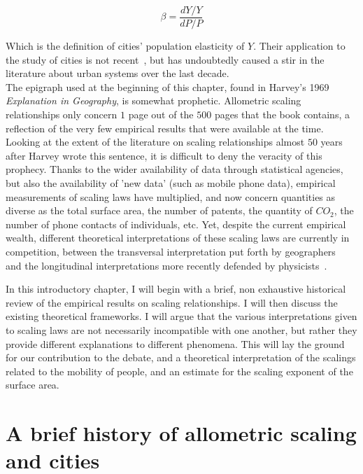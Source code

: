 \begin{equation}
    \beta = \frac{dY/Y}{dP/P}
\end{equation}

Which is the definition of cities' population elasticity of $Y$. Their application to the study of cities
is not recent~\cite{Stewart:1947}, but has undoubtedly caused a stir in the
literature about urban systems over the last decade.\\

The epigraph used at the beginning of this chapter, found in Harvey's 1969
\emph{Explanation in Geography}, is somewhat prophetic.  Allometric scaling
relationships only concern $1$ page out of the $500$ pages that the book
contains, a reflection of the very few empirical results that were available at
the time.  Looking at the extent of the literature on scaling relationships
almost $50$ years after Harvey wrote this sentence, it is difficult to deny the
veracity of this prophecy. Thanks to the wider availability of data through
statistical agencies, but also the availability of 'new data' (such as mobile
phone data), empirical measurements of scaling laws have multiplied,
and now concern quantities as diverse as the total surface area, the number of
patents, the quantity of $CO_2$, the number of phone contacts of individuals,
etc. Yet, despite the current empirical wealth, different theoretical
interpretations of these scaling laws are currently in competition, between the
transversal interpretation put forth by geographers~\cite{Pumain:2006} and the
longitudinal interpretations more recently defended by
physicists~\cite{Bettencourt:2013, Louf:2014_smog}. 

In this introductory chapter, I will begin with a brief, non exhaustive
historical review of the empirical results on scaling relationships. I will then
discuss the existing theoretical frameworks. I will argue that the various
interpretations given to scaling laws are not necessarily incompatible with one
another, but rather they provide different explanations to different phenomena.
This will lay the ground for our contribution to the debate, and a theoretical
interpretation of the scalings related to the mobility of people, and an estimate for the scaling exponent of the surface area.


\section{A brief history of allometric scaling and cities}
\label{sec:a_brief_history_of_allometric_scaling_and_cities}

